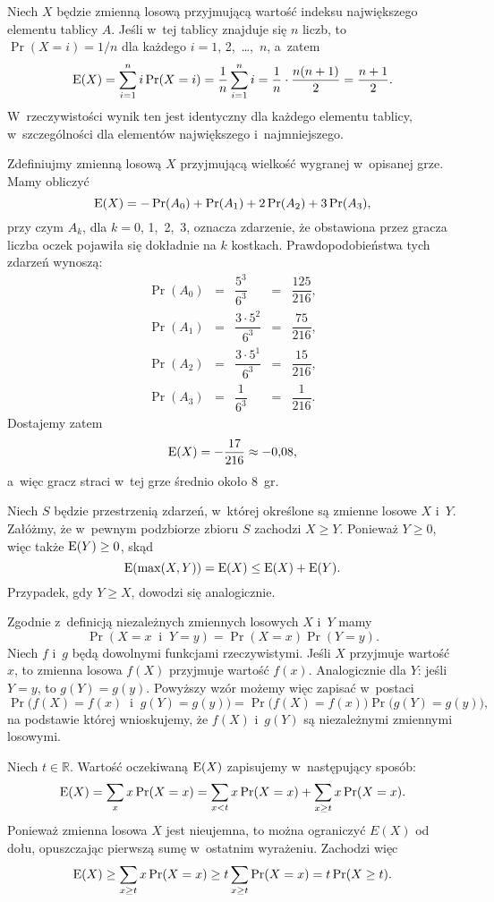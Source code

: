 \exercise %
Niech $X$ będzie zmienną losową przyjmującą wartość indeksu największego elementu tablicy $A$. Jeśli w~tej tablicy znajduje się $n$ liczb, to $\Pr(X=i)=1/n$ dla każdego $i=1$, 2,~\dots,~$n$, a~zatem
\[
	\operatorname{E}(X) = \sum_{i=1}^ni\Pr(X=i) = \frac{1}{n}\sum_{i=1}^ni = \frac{1}{n}\cdot\frac{n(n+1)}{2} = \frac{n+1}{2}.
\]
W~rzeczywistości wynik ten jest identyczny dla każdego elementu tablicy, w~szczególności dla elementów największego i~najmniejszego.

\exercise %
Zdefiniujmy zmienną losową $X$ przyjmującą wielkość wygranej w~opisanej grze. Mamy obliczyć
\[
	\operatorname{E}(X) = -\Pr(A_0)+\Pr(A_1)+2\Pr(A_2)+3\Pr(A_3),
\]
przy czym $A_k$, dla $k=0$, 1,~2,~3, oznacza zdarzenie, że obstawiona przez gracza liczba oczek pojawiła się dokładnie na $k$ kostkach. Prawdopodobieństwa tych zdarzeń wynoszą:
\[
	\begin{array}{ccccc}
	\Pr(A_0) &=& \dfrac{5^3}{6^3} &=& \dfrac{125}{216}, \\[3mm]
	\Pr(A_1) &=& \dfrac{3\cdot 5^2}{6^3} &=& \dfrac{75}{216}, \\[3mm]
	\Pr(A_2) &=& \dfrac{3\cdot 5^1}{6^3} &=& \dfrac{15}{216}, \\[3mm]
	\Pr(A_3) &=& \dfrac{1}{6^3} &=& \dfrac{1}{216}.
	\end{array}
\]
Dostajemy zatem
\[
	\operatorname{E}(X) = -\dfrac{17}{216} \approx -0{,}08,
\]
a~więc gracz straci w~tej grze średnio około 8~gr.

\exercise %
Niech $S$ będzie przestrzenią zdarzeń, w~której określone są zmienne losowe $X$ i~$Y$. Załóżmy, że w~pewnym podzbiorze zbioru $S$ zachodzi $X\ge Y$. Ponieważ $Y\ge0$, więc także $\operatorname{E}(Y)\ge0$, skąd
\[
    \operatorname{E}(\max(X,Y)) = \operatorname{E}(X) \le \operatorname{E}(X)+\operatorname{E}(Y).
\]
Przypadek, gdy $Y\ge X$, dowodzi się analogicznie.

\exercise %
Zgodnie z~definicją niezależnych zmiennych losowych $X$ i~$Y$ mamy
\[
	\Pr(X=x\;\;\text{i}\;\;Y=y) = \Pr(X=x)\Pr(Y=y).
\]
Niech $f$ i~$g$ będą dowolnymi funkcjami rzeczywistymi. Jeśli $X$ przyjmuje wartość $x$, to zmienna losowa $f(X)$ przyjmuje wartość $f(x)$. Analogicznie dla $Y$: jeśli $Y=y$, to $g(Y)=g(y)$. Powyższy wzór możemy więc zapisać w~postaci
\[
	\Pr\bigl(f(X)=f(x)\;\;\text{i}\;\;g(Y)=g(y)\bigr) = \Pr\bigl(f(X)=f(x)\bigr)\Pr\bigl(g(Y)=g(y)\bigr),
\]
na podstawie której wnioskujemy, że $f(X)$ i~$g(Y)$ są niezależnymi zmiennymi losowymi.

\exercise %
Niech $t\in\mathbb{R}$. Wartość oczekiwaną $\operatorname{E}(X)$ zapisujemy w~następujący sposób:
\[
    \operatorname{E}(X) = \sum_xx\Pr(X=x) = \sum_{x<t}x\Pr(X=x)+\sum_{x\ge t}x\Pr(X=x).
\]
Ponieważ zmienna losowa $X$ jest nieujemna, to można ograniczyć $E(X)$ od dołu, opuszczając pierwszą sumę w~ostatnim wyrażeniu. Zachodzi więc
\[
    \operatorname{E}(X) \ge \sum_{x\ge t}x\Pr(X=x) \ge t\sum_{x\ge t}\Pr(X=x) = t\Pr(X\ge t).
\]

